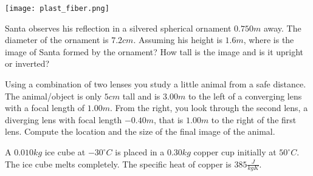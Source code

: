 \documentclass{exam}
\begin{document}
\begin{questions}
\texttt{[image: plast\_fiber.png]}



\clearpage

\question[15]
Santa observes his reflection in a silvered spherical ornament $0.750m$ away. The diameter of the ornament is $7.2cm$. Assuming his height is $1.6m$, where is the image of Santa formed by the ornament? How tall is the image and is it upright or inverted?

\clearpage



\question [20] 
Using a combination of two lenses you study a little animal from a safe distance. The animal/object is only $5cm$ tall and is $3.00m$ to the left of a converging lens with a focal length of $1.00m$. From the right, you look through the second lens, a diverging lens with focal length $-0.40m$, that is $1.00m$ to the right of the first lens. Compute the location and the size of the final image of the animal.
\clearpage


\question [25] 
A $0.010kg$ ice cube at $-30^\circ C$ is placed in a $0.30kg$ copper cup initially at $50^\circ C$. The ice cube melts completely. The specific heat of copper is $385\frac{J}{kgK}$.
\end{questions}
\end{document}
